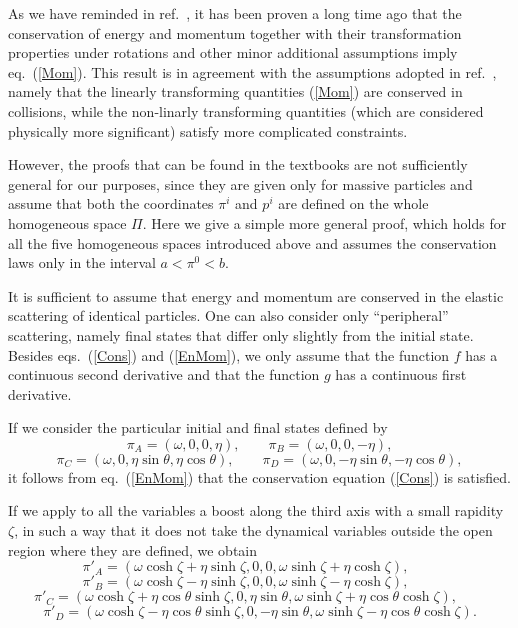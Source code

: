 \documentclass[a4paper,12pt]{article}
\begin{document}
As we have reminded in ref.\  \cite{Toller}, it has been proven a long time ago \cite{LT} that the conservation of energy and momentum together with their transformation properties under rotations and other minor additional assumptions imply eq.\  (\ref{Mom}). This result is in agreement with the assumptions adopted in ref.\ \cite{JV}, namely that the linearly transforming quantities (\ref{Mom}) are conserved in collisions, while the non-linarly transforming quantities (which are considered physically more significant) satisfy more complicated constraints.

However, the proofs that can be found in the textbooks \cite{Moller,Jackson} are not sufficiently general for our purposes, since they are given only for massive particles and assume that both the coordinates $\pi^i$ and $p^i$ are defined on the whole homogeneous space $\Pi$. Here we give a simple more general proof, which holds for all the five homogeneous spaces introduced above and assumes the conservation laws only in the interval $a < \pi^0 < b$. 

It is sufficient to assume that energy and momentum are conserved in the elastic scattering of identical particles. One can also consider only ``peripheral''  scattering, namely final states that differ only slightly from the initial state. Besides eqs.\ (\ref{Cons}) and (\ref{EnMom}), we only assume that the function $f$ has a continuous second derivative and that the function $g$ has a continuous first derivative.

If we consider the particular initial and final states defined by
\begin{displaymath}
\pi_A = (\omega, 0, 0, \eta), \qquad
\pi_B = (\omega, 0, 0, -\eta),
\end{displaymath}
\begin{equation}
\pi_C = (\omega, 0, \eta \sin\theta, \eta \cos\theta), \qquad
\pi_D = (\omega, 0, -\eta \sin\theta, -\eta\cos\theta),
\end{equation}
it follows from eq.\ (\ref{EnMom}) that the conservation equation (\ref{Cons}) is satisfied.

If we apply to all the variables a boost along the third axis with a small rapidity $\zeta$, in such a way that it does not take the dynamical variables outside the open region where they are defined, we obtain
\begin{displaymath}
\pi'_A = (\omega \cosh\zeta + \eta \sinh\zeta, 0, 0, \omega \sinh\zeta +\eta \cosh\zeta), \qquad
\end{displaymath}
\begin{displaymath}
\pi'_B = (\omega \cosh\zeta - \eta \sinh\zeta, 0, 0, \omega \sinh\zeta - \eta \cosh\zeta), \qquad
\end{displaymath}
\begin{displaymath}
\pi'_C = (\omega \cosh\zeta + \eta \cos\theta \sinh\zeta, 0, \eta \sin\theta, 
\omega \sinh\zeta +\eta \cos\theta \cosh\zeta), \qquad
\end{displaymath}
\begin{equation}
\pi'_D = (\omega \cosh\zeta - \eta \cos\theta \sinh\zeta, 0, -\eta \sin\theta, 
\omega \sinh\zeta - \eta \cos\theta \cosh\zeta).
\end{equation}
\end{document}
